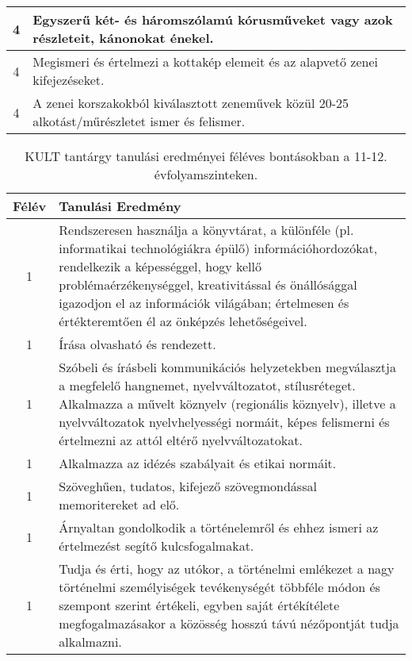 \begin{longtable}{c | p{12cm} }
                                          4 &  Egyszerű két- és háromszólamú kórusműveket vagy azok részleteit, kánonokat énekel. \\ \hline
                                          4 &  Megismeri és értelmezi a kottakép elemeit és az alapvető zenei kifejezéseket. \\ \hline
                                          4 &  A zenei korszakokból kiválasztott zeneművek közül 20-25 alkotást/műrészletet ismer és felismer. \\ \hline
                                      
                        \end{longtable}
            \clearpage

       
           \begin{longtable}{c | p{12cm} }
            \caption[KULT 11-12.]{KULT tantárgy tanulási eredményei féléves bontásokban a 11-12. évfolyamszinteken. }  \\

            \textbf{Félév} & \textbf{Tanulási Eredmény} \\
            \hline
            \endhead
                                
                                      
                                
                                          1 &  Rendszeresen használja a könyvtárat, a különféle (pl. informatikai technológiákra épülő) információhordozókat, rendelkezik a képességgel, hogy kellő problémaérzékenységgel, kreativitással és önállósággal igazodjon el az információk világában; értelmesen és értékteremtően él az önképzés lehetőségeivel. \\ \hline
                                          1 &  Írása olvasható és rendezett. \\ \hline
                                          1 &  Szóbeli és írásbeli kommunikációs helyzetekben megválasztja a megfelelő hangnemet, nyelvváltozatot, stílusréteget. Alkalmazza a művelt köznyelv (regionális köznyelv), illetve a nyelvváltozatok nyelvhelyességi normáit, képes felismerni és értelmezni az attól eltérő nyelvváltozatokat. \\ \hline
                                          1 &  Alkalmazza az idézés szabályait és etikai normáit. \\ \hline
                                          1 &  Szöveghűen, tudatos, kifejező szövegmondással memoritereket ad elő. \\ \hline
                                          1 &  Árnyaltan gondolkodik a történelemről és ehhez ismeri az értelmezést segítő kulcsfogalmakat. \\ \hline
                                          1 &  Tudja és érti, hogy az utókor, a történelmi emlékezet a nagy történelmi személyiségek tevékenységét többféle módon és szempont szerint értékeli, egyben saját értékítélete megfogalmazásakor a közösség hosszú távú nézőpontját tudja alkalmazni. \\ \hline
                                      

\end{longtable}
